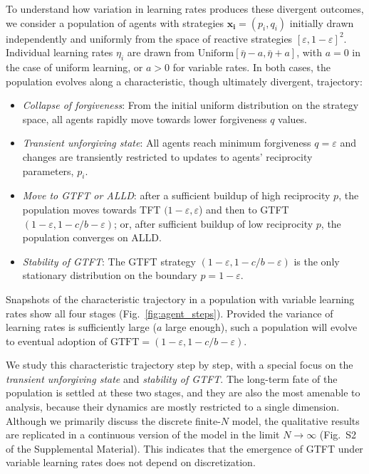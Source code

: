 \documentclass[10pt]{article}
\newcommand{\eps}{\varepsilon}
\begin{document}
To understand how variation in learning rates produces these divergent outcomes, we consider a population of agents with strategies $\mathbf{x_i}=(p_i,q_i)$ initially drawn independently and uniformly from the space of reactive strategies $[\eps, 1-\eps]^2$. Individual learning rates $\eta_i$ are drawn from $\text{Uniform}[\bar\eta-a, \bar\eta + a]$, with $a = 0$ in the case of uniform learning, or $a>0$ for variable rates. In both cases, the population evolves along a characteristic, though ultimately divergent, trajectory:

 \begin{itemize}
    \item \textit{Collapse of forgiveness}: From the initial uniform distribution on the strategy space, all agents rapidly move towards lower forgiveness $q$ values.
    \item \textit{Transient unforgiving state}: All agents reach minimum forgiveness $q = \eps$ and changes are transiently restricted to updates to agents' reciprocity parameters, $p_i$.
    \item \textit{Move to GTFT or ALLD}: after a sufficient buildup of high reciprocity $p$, the population moves towards TFT $(1-\eps, \eps$) and then to GTFT $(1-\eps,1-c/b-\eps)$; or, after sufficient buildup of low reciprocity $p$, the population converges on ALLD.
    \item \textit{Stability of GTFT}: The GTFT strategy $(1-\eps,1-c/b-\eps)$ is the only stationary distribution on the  boundary $p = 1-\eps$.
    \end{itemize}
Snapshots of the characteristic trajectory in a population with variable learning rates show all four stages (Fig.~\ref{fig:agent_steps}). Provided the variance of learning rates is sufficiently large ($a$ large enough), such a population will evolve to eventual adoption of  $\text{GTFT}=(1-\eps,1-c/b-\eps)$.

We study this characteristic trajectory step by step, with a special focus on the \textit{transient unforgiving state} and \textit{stability of GTFT}. The long-term fate of the population is settled at these two stages, and they are also the most amenable to analysis, because their dynamics are mostly restricted to a single dimension. Although we primarily discuss the discrete finite-$N$ model, the qualitative results are replicated in a continuous version of the model in the limit $N\rightarrow\infty$ (Fig.~S2 of the Supplemental Material). This indicates that the emergence of GTFT under variable learning rates does not depend on discretization.
\end{document}
